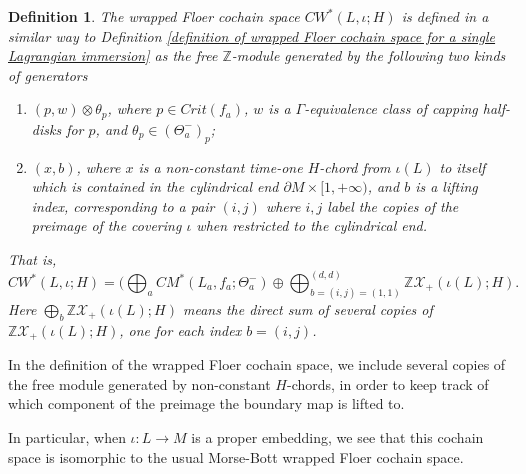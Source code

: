 \documentclass{amsart}
\newtheorem{definition}[theorem]{Definition}
\numberwithin{equation}{section}
\numberwithin{figure}{section}
\begin{document}
\begin{definition}\label{definition of wrapped Floer cochain space for a cylindrical Lagrangian immersion with clean self-intersections}
	The wrapped Floer cochain space $CW^{*}(L, \iota; H)$ is defined in a similar way to Definition \ref{definition of wrapped Floer cochain space for a single Lagrangian immersion} as the free $\mathbb{Z}$-module generated by the following two kinds of generators
\begin{enumerate}[label=(\roman*)]

\item $(p, w) \otimes \theta_{p}$, where $p \in Crit(f_{a})$, $w$ is a $\Gamma$-equivalence class of capping half-disks for $p$, and $\theta_{p} \in (\Theta_{a}^{-})_{p}$;

\item $(x, b)$, where $x$ is a non-constant time-one $H$-chord from $\iota(L)$ to itself which is contained in the cylindrical end $\partial M \times [1, +\infty)$, and $b$ is a lifting index, corresponding to a pair $(i, j)$ where $i, j$ label the copies of the preimage of the covering $\iota$ when restricted to the cylindrical end.

\end{enumerate}
That is, 
\begin{equation}
CW^{*}(L, \iota; H) = (\bigoplus_{a} CM^{*}(L_{a}, f_{a}; \Theta_{a}^{-}) \oplus \bigoplus_{b = (i, j) = (1, 1)}^{(d, d)} \mathbb{Z}\mathcal{X}_{+}(\iota(L); H).
\end{equation}
Here $\bigoplus_{b} \mathbb{Z}\mathcal{X}_{+}(\iota(L); H)$ means the direct sum of several copies of $\mathbb{Z}\mathcal{X}_{+}(\iota(L); H)$, one for each index $b = (i, j)$.
\end{definition}

	In the definition of the wrapped Floer cochain space, we include several copies of the free module generated by non-constant $H$-chords, in order to keep track of which component of the preimage the boundary map is lifted to. \par
	In particular, when $\iota: L \to M$ is a proper embedding, we see that this cochain space is isomorphic to the usual Morse-Bott wrapped Floer cochain space. \par
\end{document}
